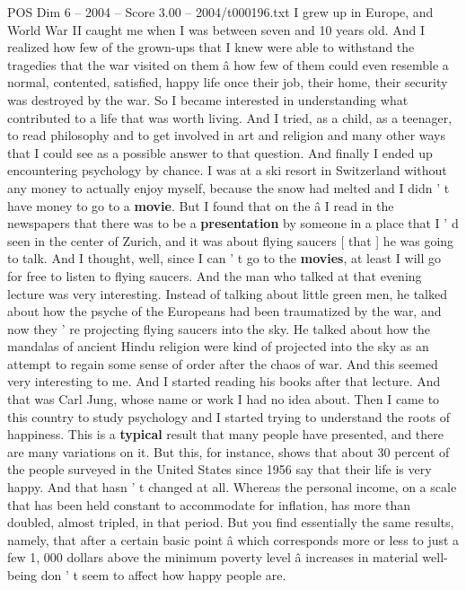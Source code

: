 \begin{textsample}{POS Dim 6 – 2004 – Score 3.00 – 2004/t000196.txt}  \label{ex:f6_pos_028}
I grew up in Europe, and World War II caught me when I was between seven and 10 years old.
And I realized how few of the grown-ups that I knew were able to withstand the tragedies that the war visited on them â how few of them could even resemble a normal, contented, satisfied, happy life once their job, their home, their security was destroyed by the war.
So I became interested in understanding what contributed to a life that was worth living.
And I tried, as a child, as a teenager, to read philosophy and to get involved in art and religion and many other ways that I could see as a possible answer to that question.
And finally I ended up encountering psychology by chance.
I was at a ski resort in Switzerland without any money to actually enjoy myself, because the snow had melted and I didn ' t have money to go to a \textbf{movie}.
But I found that on the â I read in the newspapers that there was to be a \textbf{presentation} by someone in a place that I ' d seen in the center of Zurich, and it was about flying saucers [ that ] he was going to talk.
And I thought, well, since I can ' t go to the \textbf{movies}, at least I will go for free to listen to flying saucers.
And the man who talked at that evening lecture was very interesting.
Instead of talking about little green men, he talked about how the psyche of the Europeans had been traumatized by the war, and now they ' re projecting flying saucers into the sky.
He talked about how the mandalas of ancient Hindu religion were kind of projected into the sky as an attempt to regain some sense of order after the chaos of war.
And this seemed very interesting to me.
And I started reading his books after that lecture.
And that was Carl Jung, whose name or work I had no idea about.
Then I came to this country to study psychology and I started trying to understand the roots of happiness.
This is a \textbf{typical} result that many people have presented, and there are many variations on it.
But this, for instance, shows that about 30 percent of the people surveyed in the United States since 1956 say that their life is very happy.
And that hasn ' t changed at all.
Whereas the personal income, on a scale that has been held constant to accommodate for inflation, has more than doubled, almost tripled, in that period.
But you find essentially the same results, namely, that after a certain basic point â which corresponds more or less to just a few 1, 000 dollars above the minimum poverty level â increases in material well-being don ' t seem to affect how happy people are.

\end{textsample}
